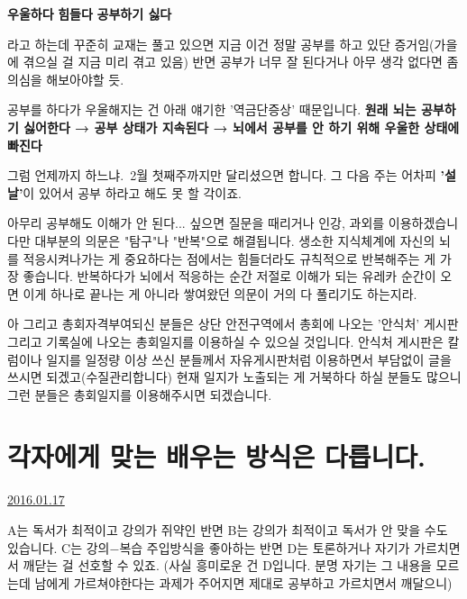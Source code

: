 \vspace{5mm}

\textbf{우울하다}
\textbf{힘들다}
\textbf{공부하기 싫다}
\vspace{5mm}

라고 하는데 꾸준히 교재는 풀고 있으면 지금 이건 정말 공부를 하고 있단 증거임(가을에 겪으실 걸 지금 미리 겪고 있음)
반면 공부가 너무 잘 된다거나 아무 생각 없다면 좀 의심을 해보아야할 듯.
\vspace{5mm}

공부를 하다가 우울해지는 건 아래 얘기한 '역금단증상' 때문입니다.
\textbf{원래 뇌는 공부하기 싫어한다 → 공부 상태가 지속된다 → 뇌에서 공부를 안 하기 위해 우울한 상태에 빠진다}
\vspace{5mm}

그럼 언제까지 하느냐. 2월 첫째주까지만 달리셨으면 합니다.
그 다음 주는 어차피 \textbf{'설날'}이 있어서 공부 하라고 해도 못 할 각이죠.
\vspace{5mm}

아무리 공부해도 이해가 안 된다... 싶으면 질문을 때리거나 인강, 과외를 이용하겠습니다만
대부분의 의문은 "탐구"나 "반복"으로 해결됩니다.
생소한 지식체계에 자신의 뇌를 적응시켜나가는 게 중요하다는 점에서는 힘들더라도 규칙적으로 반복해주는 게 가장 좋습니다.
반복하다가 뇌에서 적응하는 순간 저절로 이해가 되는 유레카 순간이 오면 이게 하나로 끝나는 게 아니라 쌓여왔던 의문이 거의 다 풀리기도 하는지라.
\vspace{5mm}

아 그리고 총회자격부여되신 분들은 상단 안전구역에서 총회에 나오는 '안식처' 게시판
그리고 기록실에 나오는 총회일지를 이용하실 수 있으실 것입니다.
안식처 게시판은 칼럼이나 일지를 일정량 이상 쓰신 분들께서 자유게시판처럼 이용하면서 부담없이 글을 쓰시면 되겠고(수질관리합니다)
현재 일지가 노출되는 게 거북하다 하실 분들도 많으니 그런 분들은 총회일지를 이용해주시면 되겠습니다.
\vspace{5mm}






\section{각자에게 맞는 배우는 방식은 다릅니다.}
\href{https://www.kockoc.com/Apoc/592462}{2016.01.17}

\vspace{5mm}

A는 독서가 최적이고 강의가 쥐약인 반면
B는 강의가 최적이고 독서가 안 맞을 수도 있습니다.
C는 강의$-$복습 주입방식을 좋아하는 반면 D는 토론하거나 자기가 가르치면서 깨닫는 걸 선호할 수 있죠.
(사실 흥미로운 건 D입니다. 분명 자기는 그 내용을 모르는데 남에게 가르쳐야한다는 과제가 주어지면 제대로 공부하고 가르치면서 깨달으니)
\vspace{5mm}

